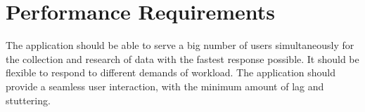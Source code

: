 \newpage
\section{Performance Requirements}
The application should be able to serve a big number of users simultaneously for the collection and research of data with the fastest response possible. It should be flexible to respond to different demands of workload. The application should provide a seamless user interaction, with the minimum amount of lag and stuttering.